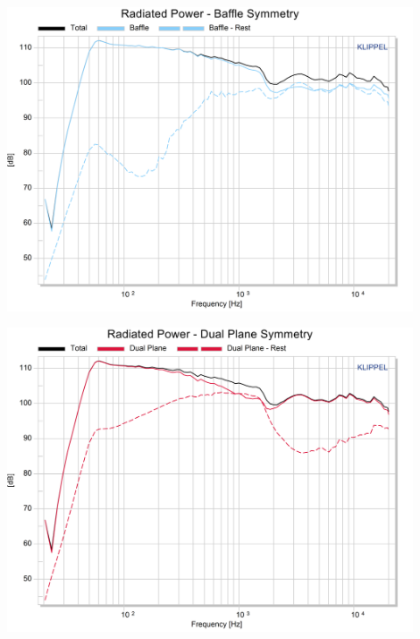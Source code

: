\documentclass{report}
\begin{document}
\begin{appendices}
\begin{minipage}{0.5\textwidth}
\begin{center}
	\includegraphics[width=0.9\textwidth]{Sym/studio_RadPow_B}
    \captionsetup{hypcap=false}
    \label{Curves:studio_B}
\end{center}
\end{minipage}
\begin{minipage}{0.5\textwidth}
\begin{center}
	\includegraphics[width=0.9\textwidth]{Sym/studio_RadPow_Dps}
    \captionsetup{hypcap=false}
    \label{Curves:studio_Dps}
\end{center}
\end{minipage}


\end{appendices}
\end{document}
